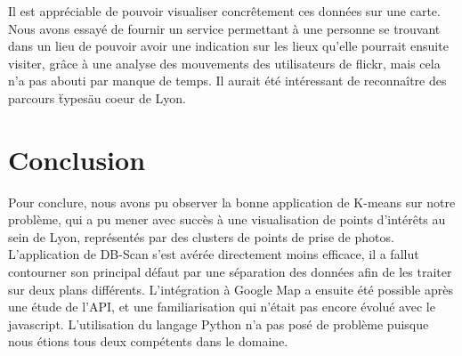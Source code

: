 \pagebreak


Il est appréciable de pouvoir visualiser concrêtement ces données sur une carte. Nous avons essayé de fournir un service permettant à une personne se trouvant dans un lieu de pouvoir avoir une indication sur les lieux qu'elle pourrait ensuite visiter, grâce à une analyse des mouvements des utilisateurs de flickr, mais cela n'a pas abouti par manque de temps. Il aurait été intéressant de reconnaître des parcours \"types\" au coeur de Lyon. 


\section{Conclusion}

Pour conclure, nous avons pu observer la bonne application de K-means sur notre problème, qui a pu mener avec succès à une visualisation de points d'intérêts au sein de Lyon, représentés par des clusters de points de prise de photos. L'application de DB-Scan s'est avérée directement moins efficace, il a fallut contourner son principal défaut par une séparation des données afin de les traiter sur deux plans différents.
L'intégration à Google Map a ensuite été possible après une étude de l'API, et une familiarisation qui n'était pas encore évolué avec le javascript. L'utilisation du langage Python n'a pas posé de problème puisque nous étions tous deux compétents dans le domaine.


\pagebreak

